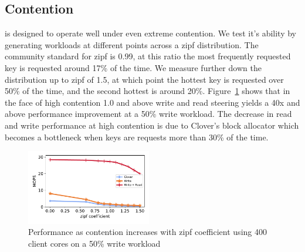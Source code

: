 \subsection{Contention}

{\sword} is designed to operate well under even extreme contention. We test it's
ability by generating workloads at different points across a zipf distribution.
The community standard for zipf is 0.99, at this ratio the most frequently
requested key is requested around 17\% of the time. We measure further down the
distribution up to zipf of 1.5, at which point the hottest key is requested over
50\% of the time, and the second hottest is around 20\%.
Figure~\ref{fig:contention} shows that in the face of high contention 1.0 and
above write and read steering yields a 40x and above performance improvement at
a 50\% write workload. The decrease in read and write performance at high
contention is due to Clover's block allocator which becomes a bottleneck when
keys are requests more than 30\% of the time.

\begin{figure}
  \centering
  \includegraphics[width=0.485\textwidth]{fig/contention.pdf}

    \caption{Performance as contention increases with zipf coefficient using 400
    client cores on a 50\% write workload}

    \label{fig:contention}
\end{figure}
